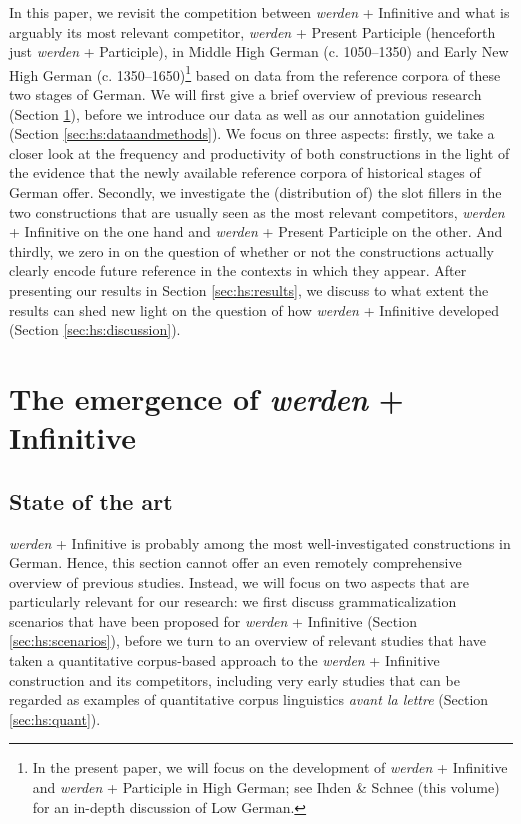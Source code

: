 \documentclass[output=paper,colorlinks,citecolor=brown]{langscibook}
\begin{document}
In this paper, we revisit the competition between \textit{werden} + Infinitive and what is arguably its most relevant competitor, \textit{werden} + Present Participle (henceforth just \textit{werden} + Participle), in Middle High German (c. 1050--1350) and Early New High German (c. 1350--1650)\footnote{In the present paper, we will focus on the development of \textit{werden} + Infinitive and \textit{werden} + Participle in High German; see Ihden \& Schnee (this volume) for an in-depth discussion of Low German.} based on data from the reference corpora of these two stages of German. We will first give a brief overview of previous research (Section \ref{sec:hs:emergence}), before we introduce our data as well as our annotation guidelines (Section \ref{sec:hs:dataandmethods}). We focus on three aspects: firstly, we take a closer look at the frequency and productivity of both constructions in the light of the evidence that the newly available reference corpora of historical stages of German offer. Secondly, we investigate the (distribution of) the slot fillers in the two constructions that are usually seen as the most relevant competitors, \textit{werden} + Infinitive on the one hand and \textit{werden} + Present Participle on the other.  And thirdly, we zero in on the question of whether or not the constructions actually clearly encode future reference in the contexts in which they appear. After presenting our results in Section \ref{sec:hs:results}, we discuss to what extent the results can shed new light on the question of how \textit{werden} + Infinitive developed (Section \ref{sec:hs:discussion}). 



\section{The emergence of \textit{werden} + Infinitive} \label{sec:hs:emergence}

\subsection{State of the art} \label{sec:hs:whatdoweknow}

\textit{werden} + Infinitive is probably among the most well-investigated constructions in German. Hence, this section cannot offer an even remotely comprehensive overview of previous studies. Instead, we will focus on two aspects that are particularly relevant for our research: we first discuss grammaticalization scenarios that have been proposed for \textit{werden} + Infinitive (Section \ref{sec:hs:scenarios}), before we turn to an overview of relevant studies that have taken a quantitative corpus-based approach to the \textit{werden} + Infinitive construction and its competitors, including very early studies that can be regarded as examples of quantitative corpus linguistics \textit{avant la lettre} (Section \ref{sec:hs:quant}).
\end{document}
